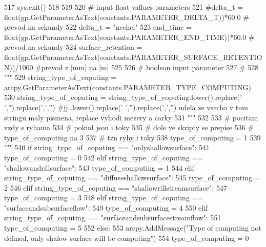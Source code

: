 \begin{DoxyCode}
517             sys.exit()
518 
519 
520   \textcolor{comment}{# input float vaflues parameters
}
521   \textcolor{comment}{#delta\_t = float(gp.GetParameterAsText(constants.PARAMETER\_DELTA\_T))*60.0 # prevod na sekundy
}
522   delta\_t = \textcolor{stringliteral}{"nechci"}
523   end\_time = float(gp.GetParameterAsText(constants.PARAMETER\_END\_TIME))*60.0 \textcolor{comment}{# prevod na sekundy
}
524   surface\_retention = float(gp.GetParameterAsText(constants.PARAMETER\_SURFACE\_RETENTION))/1000 \textcolor{comment}{#prevod z
       [mm] na [m]
}
525 
526   \textcolor{comment}{# boolean input parameter
}
527   \textcolor{comment}{#
}
528   \textcolor{stringliteral}{"""
}
529 \textcolor{stringliteral}{  string\_type\_of\_coputing = arcpy.GetParameterAsText(constants.PARAMETER\_TYPE\_COMPUTING)
}
530 \textcolor{stringliteral}{  string\_type\_of\_coputing = string\_type\_of\_coputing.lower().replace(' ','').replace(',','')  #jj
       .lower().replace(' ','').replace(',','') udela ze vsecho v tom stringu maly pismena, replace vyhodi mezery a carky
}
531 \textcolor{stringliteral}{  """}
532 
533   \textcolor{comment}{# pocitam vzdy s ryhama
}
534   \textcolor{comment}{# pokud jsou i toky
}
535   \textcolor{comment}{# dole ve skripty se prepise
}
536   \textcolor{comment}{# type\_of\_computing na 3
}
537   \textcolor{comment}{# tzn ryhy i toky
}
538   type\_of\_computing = 1
539   \textcolor{stringliteral}{"""
}
540 \textcolor{stringliteral}{  if string\_type\_of\_coputing == "onlyshallowsurface":
}
541 \textcolor{stringliteral}{      type\_of\_computing = 0
}
542 \textcolor{stringliteral}{  elif string\_type\_of\_coputing == "shallowandrillsurface":
}
543 \textcolor{stringliteral}{      type\_of\_computing = 1
}
544 \textcolor{stringliteral}{  elif string\_type\_of\_coputing == "diffuseshallowsurface":
}
545 \textcolor{stringliteral}{      type\_of\_computing = 2
}
546 \textcolor{stringliteral}{  elif string\_type\_of\_coputing == "shallowrillstreamsurface":
}
547 \textcolor{stringliteral}{      type\_of\_computing = 3
}
548 \textcolor{stringliteral}{  elif string\_type\_of\_coputing == "surfaceandsubsurfaceflow":
}
549 \textcolor{stringliteral}{      type\_of\_computing = 4
}
550 \textcolor{stringliteral}{  elif string\_type\_of\_coputing == "surfaceandsubsurfacestreamflow":
}
551 \textcolor{stringliteral}{      type\_of\_computing = 5
}
552 \textcolor{stringliteral}{  else:
}
553 \textcolor{stringliteral}{      arcpy.AddMessage("Type of computing not defined, only shalow surface will be computing")
}
554 \textcolor{stringliteral}{      type\_of\_computing = 0
}
\end{DoxyCode}
